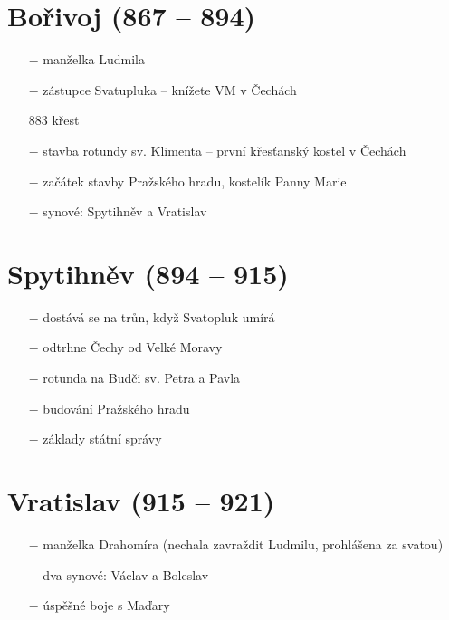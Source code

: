 \documentclass{article}
\begin{document}
\section*{Bořivoj (867 -- 894)}
\begin{itemize}
    \vspace{-0.5em}
    \setlength\itemsep{0.15em}
    \item[$-$] manželka Ludmila
    \item[$-$] zástupce Svatupluka -- knížete VM v Čechách
    \item[883] křest
    \item[$-$] stavba rotundy sv. Klimenta -- první křesťanský kostel v Čechách
    \item[$-$] začátek stavby Pražského hradu, kostelík Panny Marie
    \item[$-$] synové: Spytihněv a Vratislav
\end{itemize}

\section*{Spytihněv (894 -- 915)}
\begin{itemize}
    \vspace{-0.5em}
    \setlength\itemsep{0.15em}
    \item[$-$] dostává se na trůn, když Svatopluk umírá
    \item[$-$] odtrhne Čechy od Velké Moravy
    \item[$-$] rotunda na Budči sv. Petra a Pavla
    \item[$-$] budování Pražského hradu
    \item[$-$] základy státní správy
\end{itemize}

\section*{Vratislav (915 -- 921)}
\begin{itemize}
    \vspace{-0.5em}
    \setlength\itemsep{0.15em}
    \item[$-$] manželka Drahomíra (nechala zavraždit Ludmilu, prohlášena za svatou)
    \item[$-$] dva synové: Václav a Boleslav
    \item[$-$] úspěšné boje s Maďary
\end{itemize}
\end{document}
